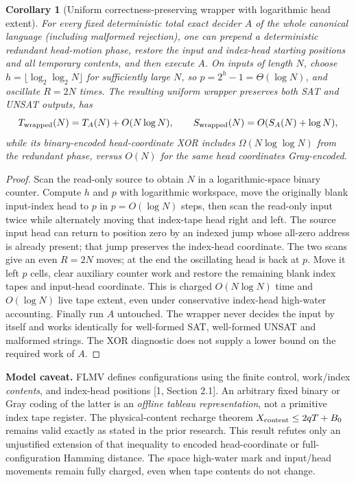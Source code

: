 \documentclass[10pt]{article}
\newtheorem{corollary}{Corollary}
\begin{document}
\begin{corollary}[Uniform correctness-preserving wrapper with logarithmic head extent]
For every fixed deterministic total exact decider $A$ of the \emph{whole} canonical language (including malformed rejection), one can prepend a deterministic redundant head-motion phase, restore the input and index-head starting positions and all temporary contents, and then execute $A$. On inputs of length $N$, choose $h=\lfloor\log_2\log_2 N\rfloor$ for sufficiently large $N$, so $p=2^h-1=\Theta(\log N)$, and oscillate $R=2N$ times. The resulting uniform wrapper preserves both SAT and UNSAT outputs, has
\[
T_{\rm wrapped}(N)=T_A(N)+O(N\log N),\qquad
S_{\rm wrapped}(N)=O(S_A(N)+\log N),
\]
while its \emph{binary-encoded head-coordinate} XOR includes $\Omega(N\log\log N)$ from the redundant phase, versus $O(N)$ for the same head coordinates Gray-encoded.
\end{corollary}
\begin{proof}
Scan the read-only source to obtain $N$ in a logarithmic-space binary counter. Compute $h$ and $p$ with logarithmic workspace, move the originally blank input-index head to $p$ in $p=O(\log N)$ steps, then scan the read-only input twice while alternately moving that index-tape head right and left. The source input head can return to position zero by an indexed jump whose all-zero address is already present; that jump preserves the index-head coordinate. The two scans give an even $R=2N$ moves; at the end the oscillating head is back at $p$. Move it left $p$ cells, clear auxiliary counter work and restore the remaining blank index tapes and input-head coordinate. This is charged $O(N\log N)$ time and $O(\log N)$ live tape extent, even under conservative index-head high-water accounting. Finally run $A$ untouched. The wrapper never decides the input by itself and works identically for well-formed SAT, well-formed UNSAT and malformed strings. The XOR diagnostic does not supply a lower bound on the required work of $A$.
\end{proof}

\noindent\textbf{Model caveat.} FLMV defines configurations using the finite control, work/index \emph{contents}, and index-head positions [1, Section 2.1]. An arbitrary fixed binary or Gray coding of the latter is an \emph{offline tableau representation}, not a primitive index tape register. The physical-content recharge theorem $X_{\rm content}\le2qT+B_0$ remains valid exactly as stated in the prior research. This result refutes only an unjustified extension of that inequality to encoded head-coordinate or full-configuration Hamming distance. The space high-water mark and input/head movements remain fully charged, even when tape contents do not change.
\end{document}
